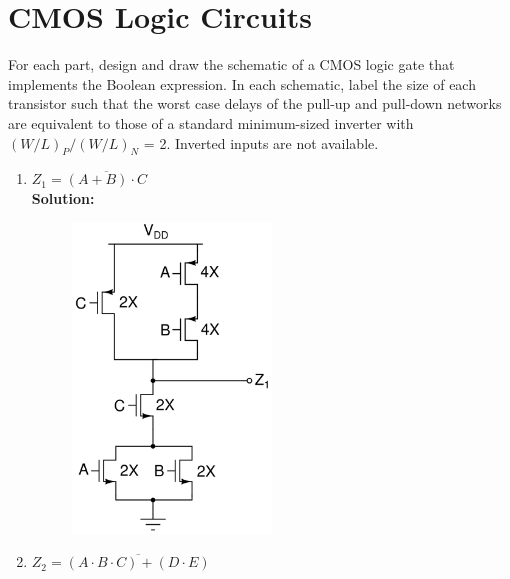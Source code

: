 \documentclass{article}
\begin{document}
\section*{CMOS Logic Circuits}
For each part, design and draw the schematic of a CMOS logic gate that implements the Boolean expression. In each schematic, label the size of each transistor such that the worst case delays of the pull-up and pull-down networks are equivalent to those of a standard minimum-sized inverter with $(W/L)_P/(W/L)_N$ = 2.  Inverted inputs are not available.
\begin{enumerate}[label=(\alph*)]
    \item $Z_1 = \overline{(A+B) \cdot C}$ \\
    
    \textbf{Solution:}
        \begin{figure}[!h]
        \centering
        \includegraphics[width=0.5\textwidth]{figures/ece342_cc_q8_a.png}
        \end{figure}
        \newpage
    \item $Z_2 = \overline{(A \cdot B \cdot C) + (D \cdot E)}$ \\
    

\end{enumerate}
\end{document}
